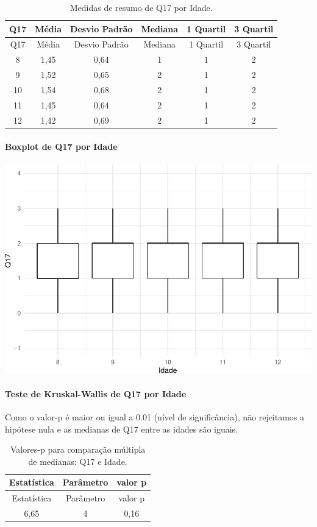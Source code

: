 \documentclass[]{article}
\let\oldparagraph\paragraph
\renewcommand{\paragraph}[1]{\oldparagraph{#1}\mbox{}}
\begin{document}
\begin{longtable}[]{@{}cccccc@{}}
\caption{\label{tab:unnamed-chunk-214}Medidas de resumo de Q17 por Idade.}\tabularnewline
\toprule
Q17 & Média & Desvio Padrão & Mediana & 1 Quartil & 3 Quartil\tabularnewline
\midrule
\endfirsthead
\toprule
Q17 & Média & Desvio Padrão & Mediana & 1 Quartil & 3 Quartil\tabularnewline
\midrule
\endhead
8 & 1,45 & 0,64 & 1 & 1 & 2\tabularnewline
9 & 1,52 & 0,65 & 2 & 1 & 2\tabularnewline
10 & 1,54 & 0,68 & 2 & 1 & 2\tabularnewline
11 & 1,45 & 0,64 & 2 & 1 & 2\tabularnewline
12 & 1,42 & 0,69 & 2 & 1 & 2\tabularnewline
\bottomrule
\end{longtable}

\hypertarget{boxplot-de-q17-por-idade}{%
\paragraph{Boxplot de Q17 por Idade}\label{boxplot-de-q17-por-idade}}

\begin{center}\includegraphics[width=0.75\linewidth]{relatorio_covid19_files/figure-latex/unnamed-chunk-215-1} \end{center}

\hypertarget{teste-de-kruskal-wallis-de-q17-por-idade}{%
\paragraph{Teste de Kruskal-Wallis de Q17 por Idade}\label{teste-de-kruskal-wallis-de-q17-por-idade}}

Como o valor-p é maior ou igual a 0.01 (nível de significância), não rejeitamos a hipótese nula e as medianas de Q17 entre as idades são iguais.

\begin{longtable}[]{@{}ccc@{}}
\caption{\label{tab:unnamed-chunk-217}Valores-p para comparação múltipla de medianas: Q17 e Idade.}\tabularnewline
\toprule
Estatística & Parâmetro & valor p\tabularnewline
\midrule
\endfirsthead
\toprule
Estatística & Parâmetro & valor p\tabularnewline
\midrule
\endhead
6,65 & 4 & 0,16\tabularnewline
\bottomrule
\end{longtable}
\end{document}
